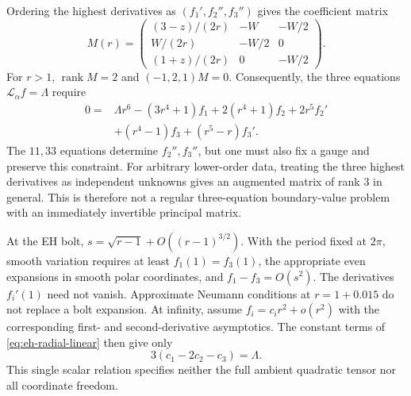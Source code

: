 \documentclass[a4paper,11pt]{article}
\numberwithin{equation}{section}
\theoremstyle{definition}
\begin{document}
Ordering the highest derivatives as $(f_1',f_2'',f_3'')$ gives the coefficient matrix
\[
M(r)=\begin{pmatrix}
(3-z)/(2r)&-W&-W/2\\
W/(2r)&-W/2&0\\
(1+z)/(2r)&0&-W/2
\end{pmatrix}.
\]
For $r>1$, $\operatorname{rank}M=2$ and $(-1,2,1)M=0$.
Consequently, the three equations $\mathscr L_\alpha f=\Lambda$ require
\begin{equation}\label{eq:eh-radial-constraint}
\begin{split}
0={}&\Lambda r^6-(3r^4+1)f_1+2(r^4+1)f_2+2r^5f_2'\\
&+(r^4-1)f_3+(r^5-r)f_3'.
\end{split}
\end{equation}
The $11,33$ equations determine $f_2'',f_3''$, but one must also fix a gauge and preserve this constraint.
For arbitrary lower-order data, treating the three highest derivatives as independent unknowns gives an augmented matrix of rank $3$ in general.
This is therefore not a regular three-equation boundary-value problem with an immediately invertible principal matrix.

At the EH bolt, $s=\sqrt{r-1}+O((r-1)^{3/2})$.
With the period fixed at $2\pi$, smooth variation requires at least $f_1(1)=f_3(1)$,
the appropriate even expansions in smooth polar coordinates, and $f_1-f_3=O(s^2)$.
The derivatives $f_i'(1)$ need not vanish. Approximate Neumann conditions at $r=1+0.015$ do not replace a bolt expansion.
At infinity, assume $f_i=c_ir^2+o(r^2)$ with the corresponding first- and second-derivative asymptotics.
The constant terms of \eqref{eq:eh-radial-linear} then give only
\begin{equation}\label{eq:eh-quadratic-relation}
3(c_1-2c_2-c_3)=\Lambda.
\end{equation}
This single scalar relation specifies neither the full ambient quadratic tensor nor all coordinate freedom.
\end{document}
